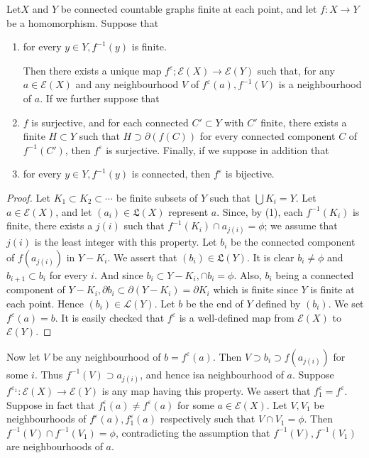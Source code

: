 \setcounter{thm}{0}
\begin{thm}\label{chap5:thm1}%
  Let\pageoriginale $X$ and $Y$ be connected countable graphs finite at each point,
  and let $f:  X \to Y$ be a homomorphism. Suppose that  
  \begin{enumerate}
    \renewcommand{\labelenumi}{\rm (\theenumi)}
  \item for every $y \in  Y, f^{-1}(y)$ is finite.
    
    Then there exists a unique map $f^\varepsilon;\mathscr{E}(X) \to
    \mathscr{E}(Y)$ such that, for any $a \in \mathscr{E}(X)$ and any
    neighbourhood $V$ of $f^{\varepsilon}(a), f^{-1}(V)$ is a
    neighbourhood of $a$. If we further suppose that 
  \item $f$ is surjective, and for each connected $C' \subset Y$ with
    $C'$ finite, there exists a finite $H \subset Y$ such  that $H
    \supset \partial (f(C))$ for every connected component $C$ of
    $f^{-1}(C')$, then $f^{\varepsilon}$ is surjective. Finally, if we
    suppose in addition  that  
  \item for every $y \in Y, f^{-1} (y)$ is connected, then $f^\varepsilon$
    is bijective. 
  \end{enumerate}
\end{thm}
     
\begin{proof}
  Let $K_1\subset K_2 \subset \cdots$ be finite subsets of $Y$ such that
  $\bigcup K_i=Y$. Let $a \in  \mathscr{E}(X)$, and let $(a_i) \in
  \mathfrak{L}(X)$ represent $a$. Since, by (1), each $f^{-1}(K_i)$ is
  finite, there exists a $j(i)$ such that $f^{-1}(K_i) \cap a_{j(i)} =
  \phi$;  we assume  that $j(i)$  is the least
  integer with this property. Let $b_i$ be the connected component of
  $f(a_{j(i)})$ in $Y-K_i$. We assert that $(b_i) \in
  \mathfrak{L}(Y)$. It is clear $b_i \neq \phi$  and $b_{i+1} \subset
  b_i$ for every $i$. And since $b_i \subset Y-K_i, \cap b_i =
  \phi$. Also, $b_i$ being a connected component of $Y-K_i, \partial b_i
  \subset \partial (Y-K_i)= \partial K_i$ which is finite since $Y$  is
  finite at each point. Hence $(b_i) \in \mathscr{L} (Y)$. Let $b$ be
  the end of $Y$ defined by $(b_i)$. We set $f^\varepsilon(a) =b$. It is easily
  checked that $f^{\varepsilon}$ is a well-defined map from
  $\mathscr{E}(X)$ to $\mathscr{E}(Y)$.    
\end{proof}     
     
Now let $V$ be any neighbourhood of $b= f^\varepsilon(a)$. Then
$V \supset b_i \supset f(a_{j(i)})$ for some $i$. Thus $f^{-1}(V)
\supset a_{j(i)}$, and hence is\pageoriginale a neighbourhood of $a$. Suppose
$f^{\varepsilon_1}: \mathscr{E}(X) \rightarrow \mathscr{E}(Y)$ is
any map having this property. We assert that $f^{\varepsilon}_1=
f^{\varepsilon}$. Suppose in fact that $f^{\varepsilon}_1(a) \neq
f^{\varepsilon}(a)$ for some $a \in \mathscr{E}(X)$. Let $V,V_1$
be neighbourhoods of $f^\varepsilon(a), f_1^{\varepsilon}(a)$
respectively such that $V \cap V_1 = \phi$. Then $f^{-1}(V) \cap
f^{-1}(V_1)= \phi$, contradicting the assumption that $f^{-1}(V),
f^{-1}(V_1)$ are neighbourhoods of $a$.  

